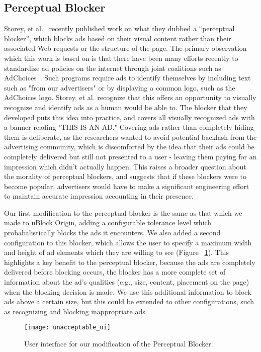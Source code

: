 \subsection{Perceptual Blocker}
Storey, et al.~\cite{storey2016future} recently published work on what they dubbed a ``perceptual blocker'', which blocks ads based on their visual content rather than their associated Web requests or the structure of the page.
The primary observation which this work is based on is that there have been many efforts recently to standardize ad policies on the internet through joint coalitions such as AdChoices~\cite{adchoices}.
Such programs require ads to identify themselves by including text such as "from our advertisers" or by displaying a common logo, such as the AdChoices logo.
Storey, et al. recognize that this offers an opportunity to visually recognize and identify ads as a human would be able to.
The blocker that they developed puts this idea into practice, and covers all visually recognized ads with a banner reading "THIS IS AN AD."
Covering ads rather than completely hiding them is deliberate, as the researchers wanted to avoid potential backlash from the advertising community, which is discomforted by the idea that their ads could be completely delivered but still not presented to a user - leaving them paying for an impression which didn't actually happen.
This raises a broader question about the morality of perceptual blockers, and suggests that if these blockers were to become popular, advertisers would have to make a significant engineering effort to maintain accurate impression accounting in their presence.

Our first modification to the perceptual blocker is the same as that which we made to uBlock Origin, adding a configurable tolerance level which probabalistically blocks the ads it encounters.
We also added a second configuration to this blocker, which allows the user to specify a maximum width and height of ad elements which they are willing to see (Figure ~\ref{fig:unacceptable_ui}).
This highlights a key benefit to the perceptual blocker, because the ads are completely delivered before blocking occurs, the blocker has a more complete set of information about the ad's qualities (e.g., size, content, placement on the page) when the blocking decision is made.
We use this additional information to block ads above a certain size, but this could be extended to other configurations, such as recognizing and blocking inappropriate ads.

\begin{figure}[h]
\centering
\texttt{[image: unacceptable\_ui]}
\caption{User interface for our modification of the Perceptual Blocker.}
\label{fig:unacceptable_ui}
\end{figure}

